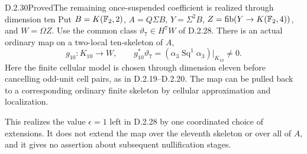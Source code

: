 \begin{claim}{D.2.30}{Proved}{The remaining once-suspended coefficient is realized through dimension ten}
Put $B=K(\mathbb F_2,2)$, $A=Q\Sigma B$, $Y=\Sigma^2B$,
$Z=\operatorname{fib}(Y\to K(\mathbb F_2,4))$, and $W=\Omega Z$.
Use the common class $\vartheta_7\in H^7W$ of D.2.28.
There is an actual ordinary map on a two-local ten-skeleton
of $A$,
\[
 g_{10}:K_{10}\longrightarrow W,
 \qquad
 g_{10}^*\vartheta_7=
       (\alpha_3\operatorname{Sq}^1\alpha_3)|_{K_{10}}\ne0.
 \tag{D.2.30a}
\]
Here the finite cellular model is chosen through dimension eleven
before cancelling odd-unit cell pairs, as in D.2.19--D.2.20.
The map can be pulled back to a corresponding ordinary finite
skeleton by cellular approximation and localization.

This realizes the value $\epsilon=1$ left in D.2.28 by one
coordinated choice of extensions. It does not extend the map
over the eleventh skeleton or over all of $A$, and it gives
no assertion about subsequent nullification stages.
\end{claim}
